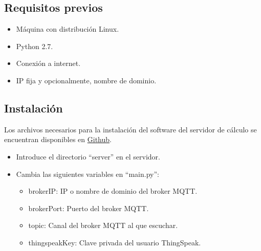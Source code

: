 \subsection{Requisitos previos}
\label{makereference8.4.1}

\begin{itemize}
\item Máquina con distribución Linux.
\item Python 2.7.
\item Conexión a internet.
\item IP fija y opcionalmente, nombre de dominio.
\end{itemize}

\subsection{Instalación}
\label{makereference8.4.2}
Los archivos necesarios para la instalación del software del servidor de cálculo se encuentran disponibles en \href{https://github.com/MrSlide22/TFG/server}{Github}.

\begin{itemize}
	\item Introduce el directorio ``server'' en el servidor.
	\item Cambia las siguientes variables en ``main.py'':
	\begin{itemize}
	\item brokerIP: IP o nombre de dominio del broker MQTT.
	\item brokerPort: Puerto del broker MQTT.
	\item topic: Canal del broker MQTT al que escuchar.
	\item thingspeakKey: Clave privada del usuario ThingSpeak.
	\end{itemize}
\end{itemize}